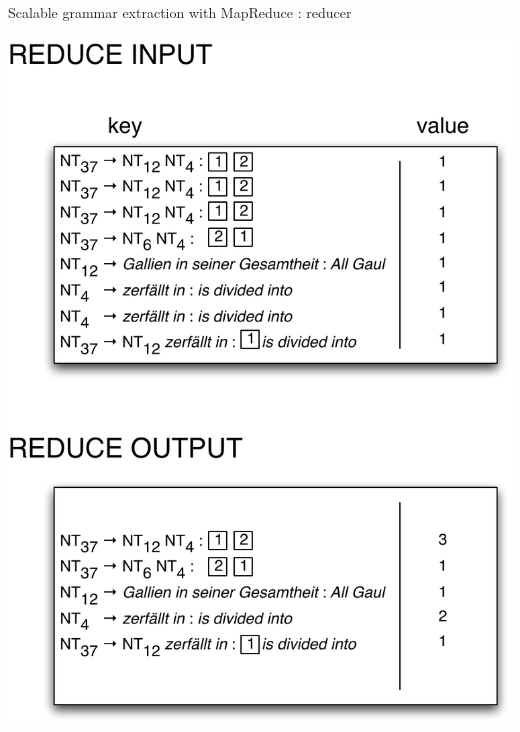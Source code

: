 \documentclass{beamer}
\begin{document}
\begin{frame}[t]{Scalable grammar extraction with MapReduce : reducer}
\begin{center}
  \includegraphics[scale=0.4]{reducer.pdf}
\end{center}
\end{frame}
\end{document}
